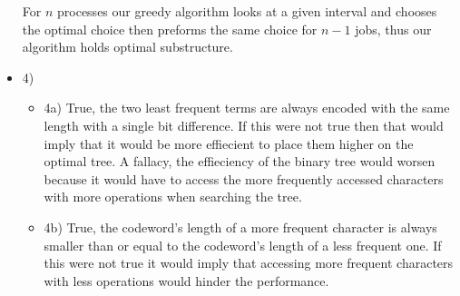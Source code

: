 \documentclass[ 12pt ]{article}
\begin{document}
\begin{itemize}
	For $n$ processes our greedy algorithm looks at a given interval and chooses 
	the optimal choice then preforms the same choice for $n-1$ jobs, thus our
	algorithm holds optimal substructure.
	\newpage

	\item[] {\large 4)}
	\begin{itemize}
		\item[] {\large 4a)}
		True, the two least frequent terms are always encoded with the same length
		with a single bit difference. If this were not true then that would imply
		that it would be more effiecient to place them higher on the optimal tree.
		A fallacy, the effieciency of the binary tree would worsen because it would
		have to access the more frequently accessed characters with more operations
		when searching the tree. \\

		\item[] {\large 4b)}
		True, the codeword's length of a more frequent character is always smaller
		than or equal to the codeword’s length of a less frequent one. If this were
		not true it would imply that accessing more frequent characters with less
		operations would hinder the performance.

	\end{itemize}
\end{itemize}
\end{document}
